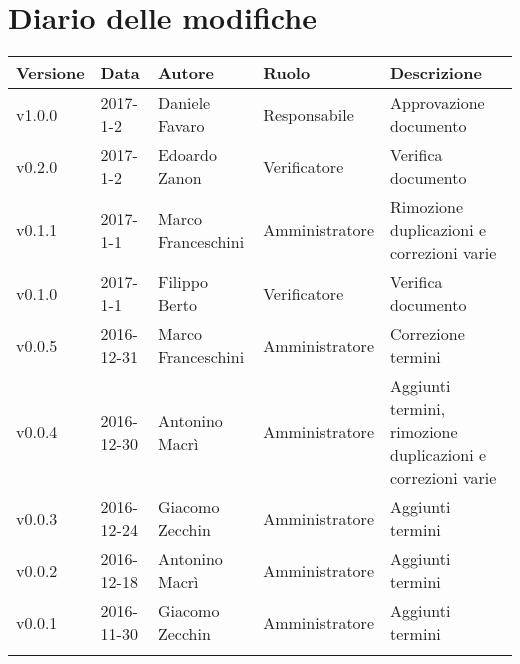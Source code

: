 \section*{Diario delle modifiche}
\begin{longtabu} to \textwidth {
	X[3,c,m] 
	X[4,c,m]
	X[4,c,m]
	X[5,c,m]
	X[10,c,m]}
	\toprule
	\textbf{Versione} & \textbf{Data}  & \textbf{Autore} & \textbf{Ruolo} & \textbf{Descrizione}\\
	\midrule
	\endhead
	
		v1.0.0 & 2017-1-2 & Daniele Favaro & Responsabile & Approvazione documento \\ 
		\addlinespace[0.4em]
		\midrule
		\addlinespace[0.4em]
		v0.2.0 & 2017-1-2 & Edoardo Zanon & Verificatore & Verifica documento \\ 
		\addlinespace[0.4em]
		\midrule
		\addlinespace[0.4em]
		v0.1.1 & 2017-1-1 & Marco Franceschini & Amministratore & Rimozione duplicazioni e correzioni varie \\ 
		\addlinespace[0.4em]
		\midrule
		\addlinespace[0.4em]
		v0.1.0 & 2017-1-1 & Filippo Berto & Verificatore & Verifica documento \\ 
		\addlinespace[0.4em]
		\midrule
		\addlinespace[0.4em]
		v0.0.5 & 2016-12-31 & Marco Franceschini & Amministratore & Correzione termini \\ 
		\addlinespace[0.4em]
		\midrule
		\addlinespace[0.4em]
		v0.0.4 & 2016-12-30 & Antonino Macrì & Amministratore & Aggiunti termini, rimozione duplicazioni e correzioni varie \\ 
		\addlinespace[0.4em]
		\midrule
		\addlinespace[0.4em]
		v0.0.3 & 2016-12-24 & Giacomo Zecchin & Amministratore & Aggiunti termini \\ 
		\addlinespace[0.4em]
		\midrule
		\addlinespace[0.4em]
		v0.0.2 & 2016-12-18 & Antonino Macrì & Amministratore & Aggiunti termini \\ 
		\addlinespace[0.4em]
		\midrule
		\addlinespace[0.4em]
		v0.0.1 & 2016-11-30 & Giacomo Zecchin & Amministratore & Aggiunti termini \\
		\addlinespace[0.4em]
		
		
	\bottomrule
\end{longtabu}
